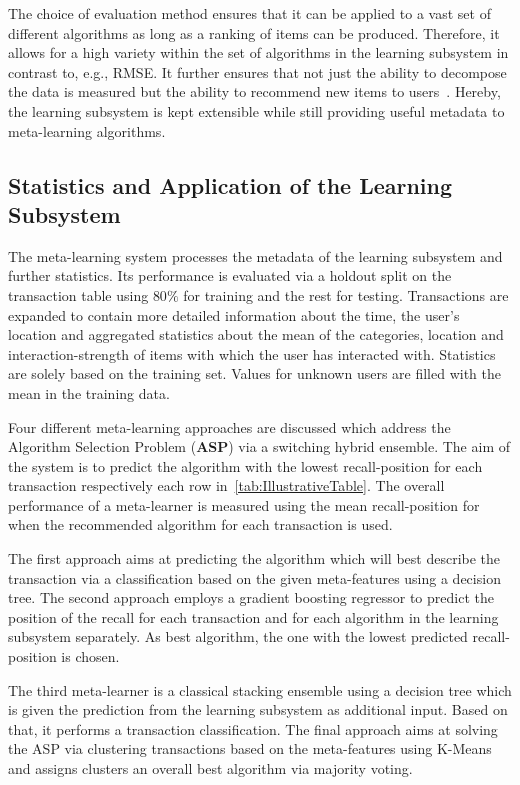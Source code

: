 \documentclass[runningheads]{llncs}
\begin{document}
The choice of evaluation method ensures that it can be applied to a vast set of different algorithms as long as a ranking of items can be produced. Therefore, it allows for a high variety within the set of algorithms in the learning subsystem in contrast to, e.g., RMSE. It further ensures that not just the ability to decompose the data is measured but the ability to recommend new items to users~\cite{Cremonesi:2010:PRA:1864708.1864721}. Hereby, the learning subsystem is kept extensible while still providing useful metadata to meta-learning algorithms.

\subsection{Statistics and Application of the Learning Subsystem}
The meta-learning system processes the metadata of the learning subsystem and further statistics. Its performance is evaluated via a holdout split on the transaction table using $80\%$ for training and the rest for testing. Transactions are expanded to contain more detailed information about the time, the user's location and aggregated statistics about the mean of the categories, location and interaction-strength of items with which the user has interacted with. Statistics are solely based on the training set. Values for unknown users are filled with the mean in the training data.

Four different meta-learning approaches are discussed which address the Algorithm Selection Problem (\textbf{ASP}) via a switching hybrid ensemble. The aim of the system is to predict the algorithm with the lowest recall-position for each transaction respectively each row in~\autoref{tab:IllustrativeTable}. The overall performance of a meta-learner is measured using the mean recall-position for when the recommended algorithm for each transaction is used.

The first approach aims at predicting the algorithm which will best describe the transaction via a classification based on the given meta-features using a decision tree. The second approach employs a gradient boosting regressor to predict the position of the recall for each transaction and for each algorithm in the learning subsystem separately. As best algorithm, the one with the lowest predicted recall-position is chosen.

The third meta-learner is a classical stacking ensemble using a decision tree which is given the prediction from the learning subsystem as additional input. Based on that, it performs a transaction classification. The final approach aims at solving the ASP via clustering transactions based on the meta-features using K-Means and assigns clusters an overall best algorithm via majority voting.
\end{document}
